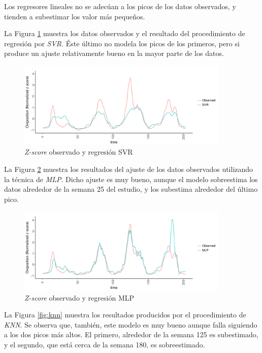     \par Los regresores lineales no se adecúan a los picos de los datos
    observados, y tienden a subestimar los valor más pequeños.

    \par La Figura \ref{fig:svr} muestra los datos observados y el resultado
      del procedimiento de regresión por \textit{SVR}. Éste último no modela los
      picos de los primeros, pero si produce un ajuste relativamente bueno
      en la mayor parte de los datos.
      \begin{figure}[hbt]
      \centering%
      \includegraphics[width=0.9\textwidth]{images/svr}%
      \caption{\textit{Z-score} observado y regresión SVR}\label{fig:svr}
      \end{figure}


    \par La Figura \ref{fig:mlp} muestra los resultados del ajuste de
    los datos observados utilizando la técnica de \textit{MLP}. Dicho ajuste es muy
    bueno, aunque el modelo sobreestima los datos alrededor de la semana 25
    del estudio, y los subestima alrededor del último pico.
      \begin{figure}[hbt]
      \centering%
      \includegraphics[width=0.9\textwidth]{images/mlp}%
      \caption{\textit{Z-score} observado y regresión MLP}\label{fig:mlp}
      \end{figure}


  \par La Figura \ref{fig:knn} muestra los resultados producidos por el procedimiento
    de \textit{KNN}. Se observa que, también, este modelo es muy bueno aunque
    falla siguiendo a los dos picos más altos. El primero, alrededor de la semana
    125 es subestimado, y el segundo, que está cerca de la semana 180, es
    sobreestimado.

